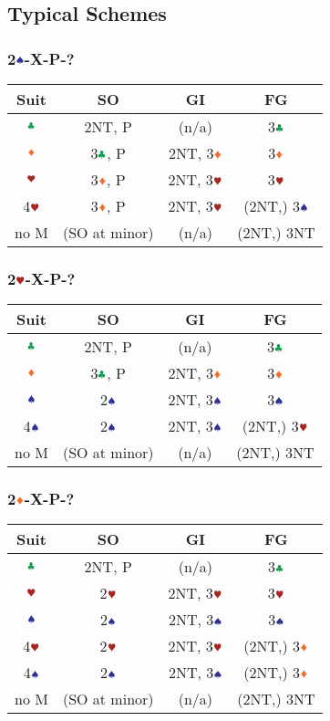 \documentclass{article}
\begin{document}
\begin{multicols}{2}
\subsection{Typical Schemes}
\subsubsection{2$\sss$-X-P-?}
\begin{tabular}{c|c|c|c}
    \hline
    Suit & SO & GI & FG \\ \hline\hline
    $\ccc$ & 2NT, P & (n/a) & 3$\ccc$ \\ \hline
    $\ddd$ & 3$\ccc$, P & 2NT, 3$\ddd$ & 3$\ddd$ \\ \hline
    $\hhh$ & 3$\ddd$, P & 2NT, 3$\hhh$ & 3$\hhh$ \\ \hline
    4$\hhh$ & 3$\ddd$, P & 2NT, 3$\hhh$ & (2NT,) 3$\sss$ \\ \hline
    no M & (SO at minor) & (n/a) & (2NT,) 3NT \\ \hline
\end{tabular}

\subsubsection{2$\hhh$-X-P-?}
\begin{tabular}{c|c|c|c}
    \hline
    Suit & SO & GI & FG \\ \hline\hline
    $\ccc$ & 2NT, P & (n/a) & 3$\ccc$ \\ \hline
    $\ddd$ & 3$\ccc$, P & 2NT, 3$\ddd$ & 3$\ddd$ \\ \hline
    $\sss$ & 2$\sss$ & 2NT, 3$\sss$ & 3$\sss$ \\ \hline
    4$\sss$ & 2$\sss$ & 2NT, 3$\sss$ & (2NT,) 3$\hhh$ \\ \hline
    no M & (SO at minor) & (n/a) & (2NT,) 3NT \\ \hline
\end{tabular}

\subsubsection{2$\ddd$-X-P-?}
\begin{tabular}{c|c|c|c}
    \hline
    Suit & SO & GI & FG \\ \hline\hline
    $\ccc$ & 2NT, P & (n/a) & 3$\ccc$ \\ \hline
    $\hhh$ & 2$\hhh$ & 2NT, 3$\hhh$ & 3$\hhh$ \\ \hline
    $\sss$ & 2$\sss$ & 2NT, 3$\sss$ & 3$\sss$ \\ \hline
    4$\hhh$ & 2$\hhh$ & 2NT, 3$\hhh$ & (2NT,) 3$\ddd$ \\ \hline
    4$\sss$ & 2$\sss$ & 2NT, 3$\sss$ & (2NT,) 3$\ddd$ \\ \hline
    no M & (SO at minor) & (n/a) & (2NT,) 3NT \\ \hline
\end{tabular}


\end{multicols}
\end{document}
